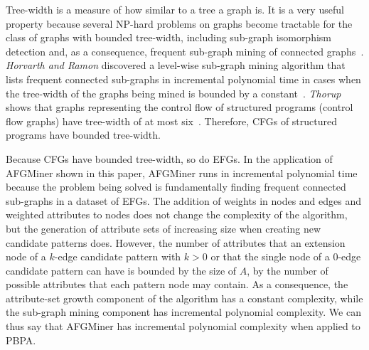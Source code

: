 Tree-width is a measure of how similar to a tree a graph is. It is a very useful property because several NP-hard problems on graphs become tractable for the class of graphs with bounded tree-width, including sub-graph isomorphism detection and, as a consequence, frequent sub-graph mining of connected graphs~\cite{Horvath}. \emph{Horvarth and Ramon} discovered a level-wise sub-graph mining algorithm that lists frequent connected sub-graphs in incremental polynomial time in cases when the tree-width of the graphs being mined is bounded by a constant~\cite{Horvath}. \emph{Thorup} shows that graphs representing the control flow of structured programs (\ie control flow graphs) have tree-width of at most six~\cite{Thorup}. Therefore, CFGs of structured programs have bounded tree-width. 

Because CFGs have bounded tree-width, so do EFGs. In the application of AFGMiner shown in this paper, AFGMiner runs in incremental polynomial time because the problem being solved is fundamentally finding frequent connected sub-graphs in a dataset of EFGs. The addition of weights in nodes and edges and weighted attributes to nodes does not change the complexity of the algorithm, but the generation of attribute sets of increasing size when creating new candidate patterns does. However, the number of attributes that an extension node of a $k$-edge candidate pattern with $k > 0$ or that the single node of a 0-edge candidate pattern can have is bounded by the size of $A$, \ie by the number of possible attributes that each pattern node may contain. As a consequence, the attribute-set growth component of the algorithm has a constant complexity, while the sub-graph mining component has incremental polynomial complexity. We can thus say that AFGMiner has incremental polynomial complexity when applied to PBPA.


